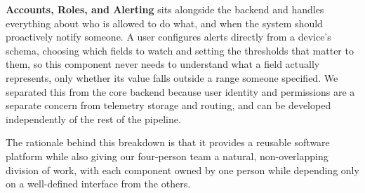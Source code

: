 \documentclass[11pt]{article}
\begin{document}
\textbf{Accounts, Roles, and Alerting} sits alongside the backend and handles everything about who is allowed to do what, and when the system should proactively notify someone. A user configures alerts directly from a device's schema, choosing which fields to watch and setting the thresholds that matter to them, so this component never needs to understand what a field actually represents, only whether its value falls outside a range someone specified. We separated this from the core backend because user identity and permissions are a separate concern from telemetry storage and routing, and can be developed independently of the rest of the pipeline.

The rationale behind this breakdown is that it provides a reusable software platform while also giving our four-person team a natural, non-overlapping division of work, with each component owned by one person while depending only on a well-defined interface from the others.
\end{document}
